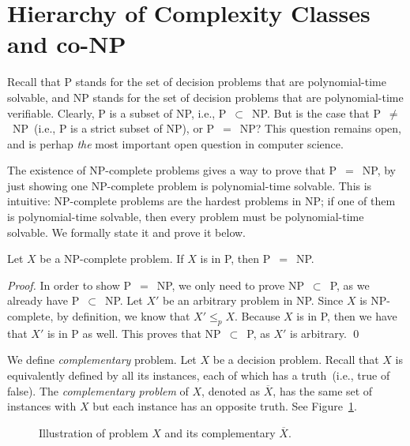 \setcounter{definition}{0} \setcounter{property}{0} \setcounter{claim}{0} \setcounter{fact}{0} \setcounter{corollary}{0} \setcounter{figure}{0}
\section{Hierarchy of Complexity Classes and co-NP}

Recall that P stands for the set of decision problems that are polynomial-time solvable,
and NP stands for the set of decision problems that are polynomial-time verifiable.
Clearly, P is a subset of NP, i.e., P{}~$\subset${}~NP.
But is the case that P{}~$\neq${}~NP~(i.e., P is a strict subset of NP),
or P{}~$=${}~NP?  This question remains open,
and is perhap \emph{the} most important open question in computer science.

The existence of NP-complete problems gives a way to prove that P{}~$=${}~NP, by just showing
one NP-complete problem is polynomial-time solvable. This is intuitive: NP-complete
problems are the hardest problems in NP; if one of them is polynomial-time solvable,
then every problem must be polynomial-time solvable. We formally state it and prove it below.

\begin{fact}
Let $X$ be a NP-complete problem. If $X$ is in P, then P{}~$=${}~NP.
\end{fact}
\emph{Proof.} 	
In order to show P{}~$=${}~NP, we only need to prove NP{}~$\subset${}~P, as we already have P{}~$\subset${}~NP. 
Let $X'$ be an arbitrary problem in NP.  
Since $X$ is NP-complete, by definition, we know that $X'\le_p X$. Because
$X$ is in P, then we have that $X'$ is in P as well.
This proves that NP{}~$\subset${}~P, as $X'$ is arbitrary.  \qed

We define \emph{complementary} problem. Let $X$ be a decision problem.
Recall that $X$ is equivalently defined by all its instances, each of which
has a truth~(i.e., true of false). The \emph{complementary problem} of $X$,
denoted as $\overline{X}$, has the same set of instances with $X$ but each instance has an opposite truth.
See Figure~\ref{fig:co-np}.

\begin{figure}[!h]
\centering{}
\caption{Illustration of problem $X$ and its complementary $\overline{X}$.}
\label{fig:co-np}
\end{figure}

